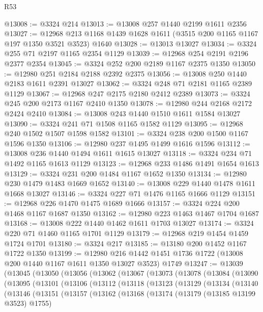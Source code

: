 \begin{lexlean}{R53}
\begin{coremodule}
@13008 := @3324 @214
@13013 := @13008 @257 @1440 @2199 @1611 @2356
@13027 := @12968 @213 @1168 @1439 @1628 @1611 (@3515 @200 @1165 @1167 @197 @1350 @3521 @3523) @1640
@13028 := @13013 @13027
@13034 := @3324 @255 @71 @2197 @1165 @2354 @1129
@13039 := @12968 @254 @2191 @2196 @2377 @2354
@13045 := @3324 @252 @200 @2189 @1167 @2375 @1350
@13050 := @12980 @251 @2184 @2188 @2392 @2375
@13056 := @13008 @250 @1440 @2183 @1611 @2391 @13027
@13062 := @3324 @248 @71 @2181 @1165 @2389 @1129
@13067 := @12968 @247 @2175 @2180 @2412 @2389
@13073 := @3324 @245 @200 @2173 @1167 @2410 @1350
@13078 := @12980 @244 @2168 @2172 @2424 @2410
@13084 := @13008 @243 @1440 @1510 @1611 @1584 @13027
@13090 := @3324 @241 @71 @1508 @1165 @1582 @1129
@13095 := @12968 @240 @1502 @1507 @1598 @1582
@13101 := @3324 @238 @200 @1500 @1167 @1596 @1350
@13106 := @12980 @237 @1495 @1499 @1616 @1596
@13112 := @13008 @236 @1440 @1494 @1611 @1615 @13027
@13118 := @3324 @234 @71 @1492 @1165 @1613 @1129
@13123 := @12968 @233 @1486 @1491 @1654 @1613
@13129 := @3324 @231 @200 @1484 @1167 @1652 @1350
@13134 := @12980 @230 @1479 @1483 @1669 @1652
@13140 := @13008 @229 @1440 @1478 @1611 @1668 @13027
@13146 := @3324 @227 @71 @1476 @1165 @1666 @1129
@13151 := @12968 @226 @1470 @1475 @1689 @1666
@13157 := @3324 @224 @200 @1468 @1167 @1687 @1350
@13162 := @12980 @223 @1463 @1467 @1704 @1687
@13168 := @13008 @222 @1440 @1462 @1611 @1703 @13027
@13174 := @3324 @220 @71 @1460 @1165 @1701 @1129
@13179 := @12968 @219 @1454 @1459 @1724 @1701
@13180 := @3324 @217
@13185 := @13180 @200 @1452 @1167 @1722 @1350
@13199 := @12980
    @216
    @1442
    @1451
    @1736
    @1722
    (@13008 @200 @1440 @1167 @1611 @1350 @13027 @3523)
    @1749
@13247 := @13039
    (@13045
      (@13050
        (@13056
          (@13062
            (@13067
              (@13073
                (@13078
                  (@13084
                    (@13090
                      (@13095
                        (@13101
                          (@13106
                            (@13112
                              (@13118
                                (@13123
                                  (@13129
                                    (@13134
                                      (@13140
                                        (@13146
                                          (@13151
                                            (@13157
                                              (@13162
                                                (@13168
                                                  (@13174
                                                    (@13179 (@13185 @13199 @3523) @1755)

\end{coremodule}
\end{lexlean}
